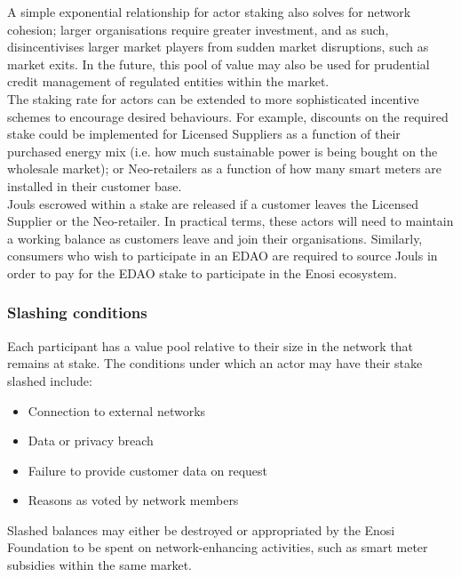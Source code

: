 \documentclass{article}
\theoremstyle{definition}
\theoremstyle{plain} %
\begin{document}
\vspace{3mm}

\noindent A simple exponential relationship for actor staking also solves for network cohesion; larger organisations require greater investment, and as such, disincentivises larger market players from sudden market disruptions, such as market exits. In the future, this pool of value may also be used for prudential credit management of regulated entities within the market.\\

\noindent The staking rate for actors can be extended to more sophisticated incentive schemes to encourage desired behaviours. For example, discounts on the required stake could be implemented for Licensed Suppliers as a function of their purchased energy mix (i.e. how much sustainable power is being bought on the wholesale market); or Neo-retailers as a function of how many smart meters are installed in their customer base. \\

\noindent Jouls escrowed within a stake are released if a customer leaves the Licensed Supplier or the Neo-retailer. In practical terms, these actors will need to maintain a working balance as customers leave and join their organisations. Similarly, consumers who wish to participate in an EDAO are required to source Jouls in order to pay for the EDAO stake to participate in the Enosi ecosystem.

\subsubsection{Slashing conditions}

Each participant has a value pool relative to their size in the network that remains at stake. The conditions under which an actor may have their stake slashed include:

\begin{itemize}
\item{Connection to external networks}
\item{Data or privacy breach}
\item{Failure to provide customer data on request}
\item{Reasons as voted by network members}
\end{itemize}

\noindent Slashed balances may either be destroyed or appropriated by the Enosi Foundation to be spent on network-enhancing activities, such as smart meter subsidies within the same market.
\end{document}
